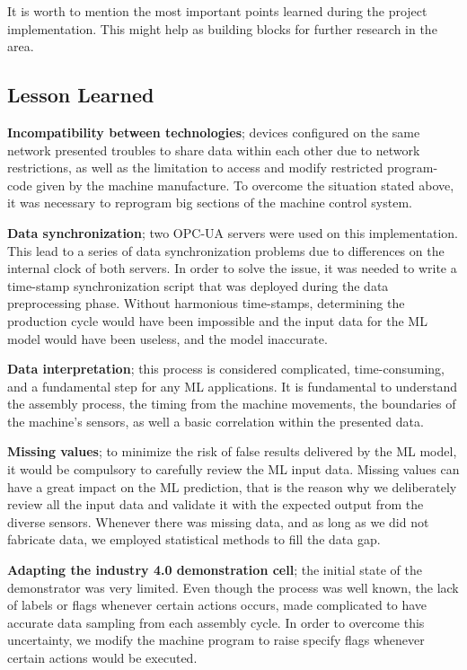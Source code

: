 \documentclass[5p,times,procedia]{elsarticle}
\begin{document}
It is worth to mention the most important points learned during the project implementation. This might help as building blocks for further research in the area.

\subsection{Lesson Learned} %

\textbf{Incompatibility between technologies}; devices configured on the same network presented troubles to share data within each other due to network restrictions, as well as the limitation to access and modify restricted program-code given by the machine manufacture. 
To overcome the situation stated above, it was necessary to reprogram big sections of the machine control system.

\textbf{Data synchronization}; two OPC-UA servers were used on this implementation. This lead to a series of data synchronization problems due to differences on the internal clock of both servers.
In order to solve the issue, it was needed to write a time-stamp synchronization script that was deployed during the data preprocessing phase. Without harmonious time-stamps, determining the production cycle would have been impossible and the input data for the ML model would have been useless, and the model inaccurate. 

\textbf{Data interpretation}; this process is considered complicated, time-consuming, and a fundamental step for any ML applications. It is fundamental to understand the assembly process, the timing from the machine movements, the boundaries of the machine's sensors, as well a basic correlation within the presented data.

\textbf{Missing values}; to minimize the risk of false results delivered by the ML model, it would be compulsory to carefully review the ML input data. Missing values can have a great impact on the ML prediction, that is the reason why we deliberately review all the input data and validate it with the expected output from the diverse sensors. Whenever there was missing data, and as long as we did not fabricate data, we employed statistical methods to fill the data gap.

\textbf{Adapting the industry 4.0 demonstration cell}; the initial state of the demonstrator was very limited. Even though the process was well known, the lack of labels or flags whenever certain actions occurs, made complicated to have accurate data sampling from each assembly cycle. In order to overcome this uncertainty, we modify the machine program to raise specify flags whenever certain actions would be executed.
\end{document}
